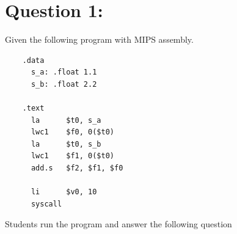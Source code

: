 \documentclass[12pt,a4paper]{article}
\begin{document}
\begin{titlepage}
\begin{center}
\begin{minipage}{0.4\textwidth}
\begin{flushright}
      \end{flushright}
    \end{minipage}

    \vfill

    \vspace{2cm}
    {\large} %
  \end{center}
\end{titlepage}


\section*{Question 1:}
Given the following program with MIPS assembly.
\begin{mdframed}[hidealllines=true,backgroundcolor=magenta!10]
  \begin{lstlisting}
    .data
      s_a: .float 1.1
      s_b: .float 2.2

    .text
      la      $t0, s_a
      lwc1    $f0, 0($t0)
      la      $t0, s_b
      lwc1    $f1, 0($t0)
      add.s   $f2, $f1, $f0

      li      $v0, 10
      syscall
  \end{lstlisting}
\end{mdframed}
Students run the program and answer the following question
\end{document}
